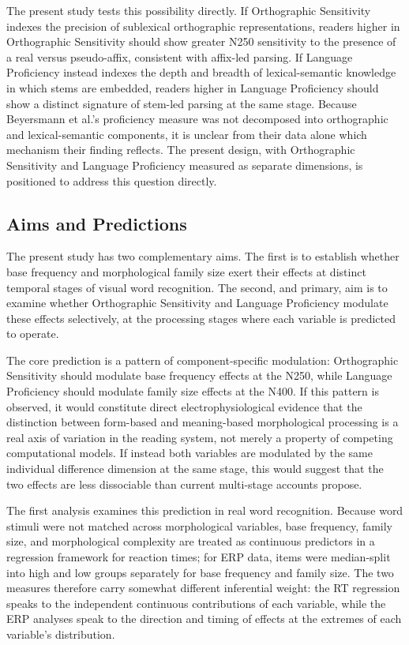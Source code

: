 	The present study tests this possibility directly. If Orthographic Sensitivity indexes the precision of sublexical orthographic representations, readers higher in Orthographic Sensitivity should show greater N250 sensitivity to the presence of a real versus pseudo-affix, consistent with affix-led parsing. If Language Proficiency instead indexes the depth and breadth of lexical-semantic knowledge in which stems are embedded, readers higher in Language Proficiency should show a distinct signature of stem-led parsing at the same stage. Because Beyersmann et al.'s proficiency measure was not decomposed into orthographic and lexical-semantic components, it is unclear from their data alone which mechanism their finding reflects. The present design, with Orthographic Sensitivity and Language Proficiency measured as separate dimensions, is positioned to address this question directly.

	\subsection{Aims and Predictions}

	The present study has two complementary aims. The first is to establish whether base frequency and morphological family size exert their effects at distinct temporal stages of visual word recognition. The second, and primary, aim is to examine whether Orthographic Sensitivity and Language Proficiency modulate these effects selectively, at the processing stages where each variable is predicted to operate.

	The core prediction is a pattern of component-specific modulation: Orthographic Sensitivity should modulate base frequency effects at the N250, while Language Proficiency should modulate family size effects at the N400. If this pattern is observed, it would constitute direct electrophysiological evidence that the distinction between form-based and meaning-based morphological processing is a real axis of variation in the reading system, not merely a property of competing computational models. If instead both variables are modulated by the same individual difference dimension at the same stage, this would suggest that the two effects are less dissociable than current multi-stage accounts propose.

	The first analysis examines this prediction in real word recognition. Because word stimuli were not matched across morphological variables, base frequency, family size, and morphological complexity are treated as continuous predictors in a regression framework for reaction times; for ERP data, items were median-split into high and low groups separately for base frequency and family size. The two measures therefore carry somewhat different inferential weight: the RT regression speaks to the independent continuous contributions of each variable, while the ERP analyses speak to the direction and timing of effects at the extremes of each variable's distribution.


